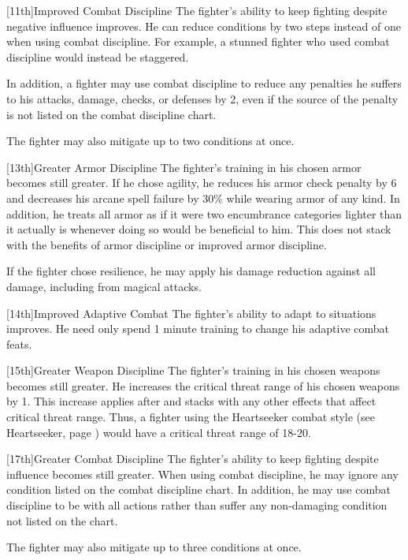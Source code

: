 [11th]{Improved Combat Discipline}
The fighter's ability to keep fighting despite negative influence improves.
He can reduce conditions by two steps instead of one when using combat discipline.
For example, a stunned fighter who used combat discipline would instead be staggered.
\par In addition, a fighter may use combat discipline to reduce any penalties he suffers to his attacks, damage, checks, or defenses by 2, even if the source of the penalty is not listed on the combat discipline chart.
\par The fighter may also mitigate up to two conditions at once.

[13th]{Greater Armor Discipline}
The fighter's training in his chosen armor becomes still greater.
If he chose agility, he reduces his armor check penalty by 6 and decreases his arcane spell failure by 30\% while wearing armor of any kind.
In addition, he treats all armor as if it were two encumbrance categories lighter than it actually is whenever doing so would be beneficial to him.
This does not stack with the benefits of armor discipline or improved armor discipline.

If the fighter chose resilience, he may apply his damage reduction against all damage, including from magical attacks.

[14th]{Improved Adaptive Combat}
The fighter's ability to adapt to situations improves.
He need only spend 1 minute training to change his adaptive combat feats.

[15th]{Greater Weapon Discipline}
The fighter's training in his chosen weapons becomes still greater.
He increases the critical threat range of his chosen weapons by 1.
This increase applies after and stacks with any other effects that affect critical threat range.
Thus, a fighter using the Heartseeker combat style (see Heartseeker, page ) would have a critical threat range of 18-20.

[17th]{Greater Combat Discipline}
The fighter's ability to keep fighting despite influence becomes still greater.
When using combat discipline, he may ignore any condition listed on the combat discipline chart.
In addition, he may use combat discipline to be \severelyimpaired with all actions rather than suffer any non-damaging condition not listed on the chart.

\par The fighter may also mitigate up to three conditions at once.

